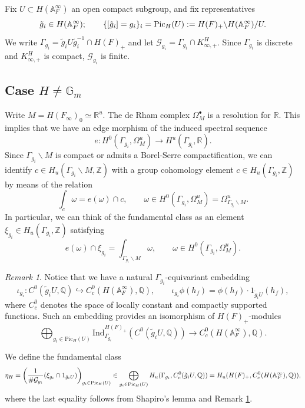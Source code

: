 \documentclass{amsart}
\theoremstyle{definition}
\theoremstyle{remark}
\newtheorem{remark}[theorem]{Remark}
\numberwithin{equation}{section}
\newcommand{\Pic}{\mathrm{Pic}}
\newcommand{\Ind}{{\mathrm{Ind}}}
\newcommand{\Z}{{\mathbb Z}}
\newcommand{\A}{{\mathbb A}}
\newcommand{\Q}{{\mathbb Q}}
\newcommand{\R}{{\mathbb R}}
\newcommand{\G}{{\mathbb G}}
\newcommand{\cG}{{\mathcal G}}
\begin{document}
Fix $U\subset H(\A_F^\infty)$ an open compact subgroup, and fix representatives 
\[
\tilde g_i\in H(\A_F^\infty);\qquad \{[\tilde g_i]=g_i\}_i={\rm Pic}_H(U):=H(F)_+\backslash H(\A_F^\infty)\slash U. 
\]
We write $\Gamma_{g_i}=\tilde g_iU \tilde g_i^{-1}\cap H(F)_+$ and let $\cG_{g_i}=\Gamma_{g_i}\cap K^H_{\infty,+}$. Since $\Gamma_{g_i}$ is discrete and $K^H_{\infty,+}$ is compact, $\cG_{g_i}$ is finite.



\subsection{Case $H\neq \G_m$}

Write $M=H(F_\infty)_0\simeq \R^u$. The de Rham complex $\Omega^\bullet_M$ is a resolution for $\R$. This implies that we have an edge morphism of the induced spectral sequence
\[
e:H^0(\Gamma_{g_i},\Omega_M^u)\longrightarrow H^u(\Gamma_{g_i},\R).
\]
Since $\Gamma_{g_i}\backslash M$ is compact or admits a Borel-Serre compactification, we can identify $c\in H_{u}(\Gamma_{g_i}\backslash M,\Z)$ with a group cohomology element $c\in H_{u}(\Gamma_{g_i},\Z)$ by means of the relation
\[
\int_c \omega=e(\omega)\cap c,\qquad \omega\in H^0(\Gamma_{g_i},\Omega_M^u)=\Omega_{\Gamma_{g_i}\backslash M}^u.
\]
In particular, we can think of the fundamental class as an element $\xi_{g_i}\in H_u(\Gamma_{g_i},\Z)$ satisfying
\begin{equation}\label{eqeint}
e(\omega)\cap \xi_{g_i}=\int_{\Gamma_{g_i}\backslash M} \omega,\qquad \omega\in H^0(\Gamma_{g_i},\Omega_M^u).
\end{equation}
\begin{remark}\label{remonSL}
 Notice that we have a natural $\Gamma_{g_i}$-equivariant embedding 
\[
\iota_{g_i}:C^0(\tilde g_iU,\Q)\hookrightarrow C_c^0(H(\A_F^\infty),\Q),\qquad \iota_{g_i} \phi(h_f) =\phi(h_f)\cdot1_{\tilde g_iU}(h_f),
\]
where $C_c^0$ denotes the space of locally constant and compactly supported functions.
Such an embedding provides an isomorphism of $H(F)_+$-modules
\[
\bigoplus_{g_i\in \Pic_H(U)}\Ind_{\Gamma_{g_i}}^{H(F)_+}(C^0(\tilde g_iU,\Q))\longrightarrow C_c^0(H(\A_F^\infty),\Q).
\]
\end{remark}
We define the fundamental class
\[
\eta_H=\left(\frac{1}{\#\cG_{g_i}}(\xi_{g_i}\cap 1_{\tilde g_i U})\right)_{g_i\in {\rm Pic}_H(U)}\in \bigoplus_{g_i \in {\rm Pic}_H(U)} H_u(\Gamma_{g_i},C_c^0(\tilde g_iU,\Q))=H_u(H(F)_+,C_c^0(H(\A_F^\infty),\Q)),
\]
where the last equality follows from Shapiro's lemma and Remark \ref{remonSL}.
\end{document}

